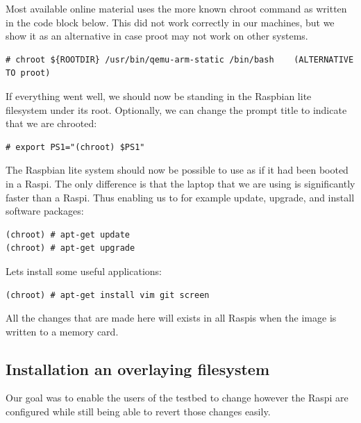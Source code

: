 Most available online material uses the more known chroot command as written in
the code block below. This did not work correctly in our machines, but we show
it as an alternative in case proot may not work on other systems.

\begin{lstlisting}[]
# chroot ${ROOTDIR} /usr/bin/qemu-arm-static /bin/bash    (ALTERNATIVE TO proot)
\end{lstlisting}
\FloatBarrier
\vspace{-5mm}

If everything went well, we should now be standing in the Raspbian lite filesystem
under its root. Optionally, we can change the prompt title to indicate that we
are chrooted:

\begin{lstlisting}[]
# export PS1="(chroot) $PS1"
\end{lstlisting}
\FloatBarrier
\vspace{-5mm}

The Raspbian lite system should now be possible to use as if it had been booted
in a \ac{Raspi}. The only difference is that the laptop that we are using is
significantly faster than a \ac{Raspi}. Thus enabling us to for example update,
upgrade, and install software packages:

\begin{lstlisting}[]
(chroot) # apt-get update
(chroot) # apt-get upgrade
\end{lstlisting}
\FloatBarrier
\vspace{-5mm}

Lets install some useful applications:
\begin{lstlisting}[]
(chroot) # apt-get install vim git screen
\end{lstlisting}
\FloatBarrier
\vspace{-5mm}

All the changes that are made here will exists in all \ac{Raspi}s when the
image is written to a memory card.

\subsection{Installation an overlaying filesystem}

Our goal was to enable the users of the testbed to change however the
\ac{Raspi} are configured while still being able to revert those changes easily.

